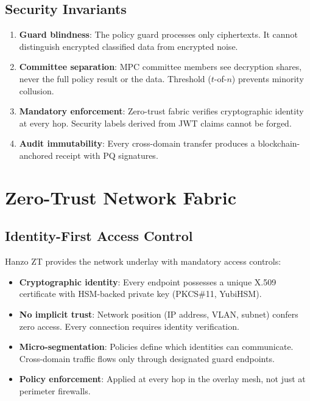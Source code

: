 \documentclass[11pt,letterpaper]{article}
\begin{document}
\subsection{Security Invariants}

\begin{enumerate}
\item \textbf{Guard blindness}: The policy guard processes only ciphertexts. It cannot distinguish encrypted classified data from encrypted noise.
\item \textbf{Committee separation}: MPC committee members see decryption shares, never the full policy result or the data. Threshold ($t$-of-$n$) prevents minority collusion.
\item \textbf{Mandatory enforcement}: Zero-trust fabric verifies cryptographic identity at every hop. Security labels derived from JWT claims cannot be forged.
\item \textbf{Audit immutability}: Every cross-domain transfer produces a blockchain-anchored receipt with PQ signatures.
\end{enumerate}

\section{Zero-Trust Network Fabric}

\subsection{Identity-First Access Control}

Hanzo ZT provides the network underlay with mandatory access controls:

\begin{itemize}
\item \textbf{Cryptographic identity}: Every endpoint possesses a unique X.509 certificate with HSM-backed private key (PKCS\#11, YubiHSM).
\item \textbf{No implicit trust}: Network position (IP address, VLAN, subnet) confers zero access. Every connection requires identity verification.
\item \textbf{Micro-segmentation}: Policies define which identities can communicate. Cross-domain traffic flows only through designated guard endpoints.
\item \textbf{Policy enforcement}: Applied at every hop in the overlay mesh, not just at perimeter firewalls.
\end{itemize}
\end{document}
